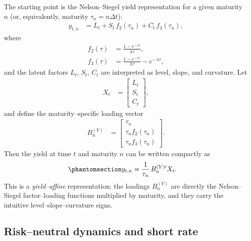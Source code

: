 \documentclass[
  letterpaper,
  DIV=11,
  numbers=noendperiod]{scrreprt}
\begin{document}
The starting point is the Nelson--Siegel yield representation for a
given maturity \(n\) (or, equivalently, maturity
\(\tau_n = n \Delta t\)):
\begin{align}
y_{t,n}
&= L_t
+ S_t \, f_2(\tau_n)
+ C_t \, f_3(\tau_n),
\end{align}
where
\begin{align}
f_2(\tau) &= \frac{1 - e^{-\lambda \tau}}{\lambda \tau}, \\
f_3(\tau) &= \frac{1 - e^{-\lambda \tau}}{\lambda \tau}
            - e^{-\lambda \tau},
\end{align}
and the latent factors \(L_t\), \(S_t\), \(C_t\) are interpreted as
level, slope, and curvature. Let
\begin{align}
X_t
&=
\left[
\begin{array}{c}
L_t \\
S_t \\
C_t
\end{array}
\right],
\end{align}
and define the maturity--specific loading vector
\begin{align}
B_n^{(Y)}
&=
\left[
\begin{array}{c}
\tau_n \\
\tau_n f_2(\tau_n) \\
\tau_n f_3(\tau_n)
\end{array}
\right].
\end{align}
Then the yield at time \(t\) and maturity \(n\) can be written compactly
as \begin{equation}\protect\phantomsection\label{eq-AFNS-yield}{
\begin{align}
y_{t,n}
&= \frac{1}{\tau_n} \, B_n^{(Y)\prime} X_t.
\end{align}
}\end{equation} This is a \emph{yield--affine} representation: the
loadings \(B_n^{(Y)}\) are directly the Nelson--Siegel factor--loading
functions multiplied by maturity, and they carry the intuitive
level--slope--curvature signs.

\subsection*{Risk--neutral dynamics and short
rate}\label{riskneutral-dynamics-and-short-rate}
\end{document}
